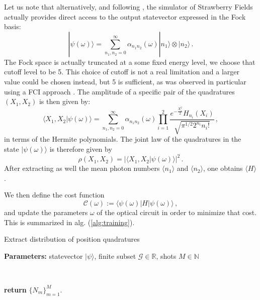\documentclass[reprint, amsmath, amssymb, floatfix, aps, pra]{revtex4-2}
\begin{document}
    Let us note that alternatively, and following \cite{arrazola2019machine}, the simulator of Strawberry Fields actually provides direct access to the output statevector expressed in the Fock basis:
    \begin{equation*}
        |\psi(\omega)\rangle = \sum_{n_1,n_2=0}^\infty \alpha_{n_1n_2}(\omega)|n_1\rangle\otimes|n_2\rangle\,.
    \end{equation*}
    The Fock space is actually truncated at a some fixed energy level, we choose that cutoff level to be 5. This choice of cutoff is not a real limitation and a larger value could be chosen instead, but 5 is sufficient, as was observed in particular using a FCI approach \cite{sadhukhan2016quantum}.
    The amplitude of a specific pair of the quadratures $(X_1, X_2)$ is then given by:
    \begin{equation*}
        \langle X_1,X_2|\psi(\omega)\rangle = \sum_{n_1,n_2=0}^\infty \alpha_{n_1n_2}(\omega)\prod_{i=1}^{2}\frac{e^{-\frac{X_i^2}{2}}H_{n_i}(X_i)}{\sqrt{\pi^{1/2}2^{n_i}n_i!}}\,,
    \end{equation*}
    in terms of the Hermite polynomials. The joint law of the quadratures in the state $|\psi(\omega)\rangle$ is therefore given by
    \begin{equation*}
        \rho(X_1,X_{2}) = \left|\langle X_1,X_2|\psi(\omega)\rangle\right|^2\,.
    \end{equation*}
    After extracting as well the mean photon numbers $\langle n_1\rangle$ and $\langle n_2\rangle$, one obtains $\langle H\rangle$.

    We then define the cost function
    \begin{equation}
    \label{eq:definition_cost}
        \mathcal C(\omega) := \langle\psi(\omega)|H|\psi(\omega)\rangle\,,
    \end{equation}
    and update the parameters $\omega$ of the optical circuit in order to minimize that cost. This is summarized in alg. (\ref{alg:training}).

    \begin{algorithm}
        \caption{Extract distribution of position quadratures}\label{alg:statistics_computation}
            \textbf{Parameters:} statevector $|\psi\rangle$, finite subset $\mathcal {G}\in\mathbb R$, shots $M\in\mathbb N$

            \

            \textbf{return} $\{N_m\}_{m=1}^M$.
    \end{algorithm}
\end{document}
